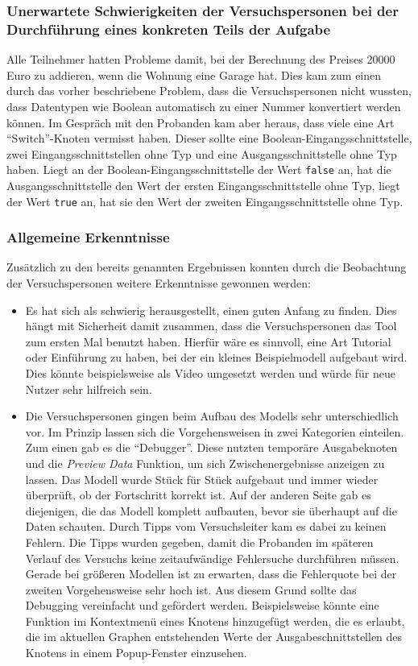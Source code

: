 \subsubsection{Unerwartete Schwierigkeiten der Versuchspersonen bei der Durchführung eines konkreten Teils der Aufgabe}
Alle Teilnehmer hatten Probleme damit, bei der Berechnung des Preises 20000 Euro zu addieren, wenn die Wohnung eine Garage hat. Dies kam zum einen durch das vorher beschriebene Problem, dass die Versuchspersonen nicht wussten, dass Datentypen wie Boolean automatisch zu einer Nummer konvertiert werden können. Im Gespräch mit den Probanden kam aber heraus, dass viele eine Art \enquote{Switch}-Knoten vermisst haben. Dieser sollte eine Boolean-Eingangsschnittstelle, zwei Eingangsschnittstellen ohne Typ und eine Ausgangsschnittstelle ohne Typ haben. Liegt an der Boolean-Eingangsschnittstelle der Wert \texttt{false} an, hat die Ausgangsschnittstelle den Wert der ersten Eingangsschnittstelle ohne Typ, liegt der Wert \texttt{true} an, hat sie den Wert der zweiten Eingangsschnittstelle ohne Typ.

\subsubsection{Allgemeine Erkenntnisse}
Zusätzlich zu den bereits genannten Ergebnissen konnten durch die Beobachtung der Versuchspersonen weitere Erkenntnisse gewonnen werden:
\begin{itemize}
    \item Es hat sich als schwierig herausgestellt, einen guten Anfang zu finden. Dies hängt mit Sicherheit damit zusammen, dass die Versuchspersonen das Tool zum ersten Mal benutzt haben. Hierfür wäre es sinnvoll, eine Art Tutorial oder Einführung zu haben, bei der ein kleines Beispielmodell aufgebaut wird. Dies könnte beispielsweise als Video umgesetzt werden und würde für neue Nutzer sehr hilfreich sein.
    \item Die Versuchspersonen gingen beim Aufbau des Modells sehr unterschiedlich vor. Im Prinzip lassen sich die Vorgehensweisen in zwei Kategorien einteilen. Zum einen gab es die \enquote{Debugger}. Diese nutzten temporäre Ausgabeknoten und die \textit{Preview Data} Funktion, um sich Zwischenergebnisse anzeigen zu lassen. Das Modell wurde Stück für Stück aufgebaut und immer wieder überprüft, ob der Fortschritt korrekt ist. Auf der anderen Seite gab es diejenigen, die das Modell komplett aufbauten, bevor sie überhaupt auf die Daten schauten. Durch Tipps vom Versuchsleiter kam es dabei zu keinen Fehlern. Die Tipps wurden gegeben, damit die Probanden im späteren Verlauf des Versuchs keine zeitaufwändige Fehlersuche durchführen müssen. Gerade bei größeren Modellen ist zu erwarten, dass die Fehlerquote bei der zweiten Vorgehensweise sehr hoch ist. Aus diesem Grund sollte das Debugging vereinfacht und gefördert werden. Beispielsweise könnte eine Funktion im Kontextmenü eines Knotens hinzugefügt werden, die es erlaubt, die im aktuellen Graphen entstehenden Werte der Ausgabeschnittstellen des Knotens in einem Popup-Fenster einzusehen.
\end{itemize}